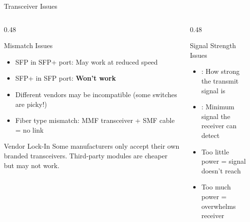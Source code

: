 \documentclass[aspectratio=169]{beamer}  %
\begin{document}
\begin{frame}{Transceiver Issues}
    \begin{columns}[T]
        \begin{column}{0.48\textwidth}
            \begin{block}{Mismatch Issues}
                \begin{itemize}
                    \small
                    \item SFP in SFP+ port: May work at reduced speed
                    \item SFP+ in SFP port: \textbf{Won't work}
                    \item Different vendors may be incompatible (some switches are picky!)
                    \item Fiber type mismatch: MMF transceiver + SMF cable = no link
                \end{itemize}
            \end{block}
            
            \vspace{0.3em}
            \begin{alertblock}{Vendor Lock-In}
                Some manufacturers only accept their own branded transceivers. Third-party modules are cheaper but may not work.
            \end{alertblock}
        \end{column}
        \begin{column}{0.48\textwidth}
            \begin{block}{Signal Strength Issues}
                \begin{itemize}
                    \small
                    \item {}: How strong the transmit signal is
                    \item {}: Minimum signal the receiver can detect
                    \item Too little power = signal doesn't reach
                    \item Too much power = overwhelms receiver
                \end{itemize}
            \end{block}
            

\end{column}
\end{columns}
\end{frame}
\end{document}
